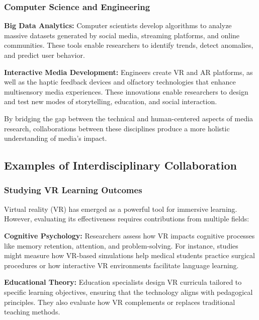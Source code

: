\documentclass[
]{book}
\begin{document}
\subsubsection{Computer Science and Engineering}\label{computer-science-and-engineering}

\textbf{Big Data Analytics:} Computer scientists develop algorithms to analyze massive datasets generated by social media, streaming platforms, and online communities. These tools enable researchers to identify trends, detect anomalies, and predict user behavior.

\textbf{Interactive Media Development:} Engineers create VR and AR platforms, as well as the haptic feedback devices and olfactory technologies that enhance multisensory media experiences. These innovations enable researchers to design and test new modes of storytelling, education, and social interaction.

By bridging the gap between the technical and human-centered aspects of media research, collaborations between these disciplines produce a more holistic understanding of media's impact.

\subsection{Examples of Interdisciplinary Collaboration}\label{examples-of-interdisciplinary-collaboration}

\subsubsection{Studying VR Learning Outcomes}\label{studying-vr-learning-outcomes}

Virtual reality (VR) has emerged as a powerful tool for immersive learning. However, evaluating its effectiveness requires contributions from multiple fields:

\textbf{Cognitive Psychology:} Researchers assess how VR impacts cognitive processes like memory retention, attention, and problem-solving. For instance, studies might measure how VR-based simulations help medical students practice surgical procedures or how interactive VR environments facilitate language learning.

\textbf{Educational Theory:} Education specialists design VR curricula tailored to specific learning objectives, ensuring that the technology aligns with pedagogical principles. They also evaluate how VR complements or replaces traditional teaching methods.
\end{document}
